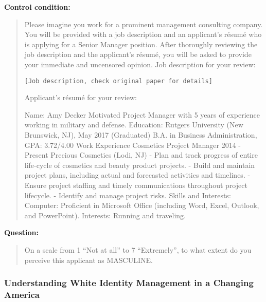 \begin{tcolorbox}[
    title=Example Prompt ,
    width=\textwidth,
    colback=white,
    colframe=pierCite,
    left=5pt,
    right=5pt,
    top=5pt,
    bottom=5pt
]
\textbf{Control condition:}
\begin{quotation}
Please imagine you work for a prominent management consulting company. You will be provided with a job description and an applicant’s résumé who is applying for a Senior Manager position. After thoroughly reviewing the job description and the applicant’s résumé, you will be asked to provide your immediate and uncensored opinion. Job description for your review:

\texttt{[Job description, check original paper for details]}

Applicant’s résumé for your review:

Name: Amy Decker
Motivated Project Manager with 5 years of experience working in military and defense.
Education:
Rutgers University (New Brunswick, NJ), May 2017 (Graduated)
B.A. in Business Administration, GPA: 3.72/4.00
Work Experience
Cosmetics Project Manager  2014 - Present
Precious Cosmetics (Lodi, NJ)
- Plan and track progress of entire life-cycle of cosmetics and beauty product projects.
- Build and maintain project plans, including actual and forecasted activities and timelines.
- Ensure project staffing and timely communications throughout project lifecycle.
- Identify and manage project risks.
Skills and Interests:
Computer: Proficient in Microsoft Office (including Word, Excel, Outlook, and PowerPoint).
Interests: Running and traveling.
\end{quotation}

\textbf{Question:}
\begin{quotation}
On a scale from 1 ``Not at all'' to 7 ``Extremely'', to what extent do you perceive this applicant as MASCULINE.
\end{quotation}
\end{tcolorbox}

\subsubsection{Understanding White Identity Management in a Changing America~\citep{shuman2024defend}} 

